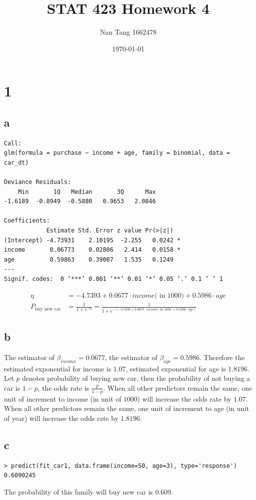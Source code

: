 \documentclass[11pt,letterpaper]{article}
\title{STAT 423 Homework 4}
\author{Nan Tang 1662478}
\date{\today}
\begin{document}
\maketitle
\section*{1}
\subsection*{a}
\begin{verbatim}
Call:
glm(formula = purchase ~ income + age, family = binomial, data = car_dt)

Deviance Residuals: 
    Min       1Q   Median       3Q      Max  
-1.6189  -0.8949  -0.5880   0.9653   2.0846  

Coefficients:
            Estimate Std. Error z value Pr(>|z|)  
(Intercept) -4.73931    2.10195  -2.255   0.0242 *
income       0.06773    0.02806   2.414   0.0158 *
age          0.59863    0.39007   1.535   0.1249  
---
Signif. codes:  0 ‘***’ 0.001 ‘**’ 0.01 ‘*’ 0.05 ‘.’ 0.1 ‘ ’ 1
\end{verbatim}

\begin{align*}
\eta &= -4.7393 + 0.0677 \cdot income \text{( in 1000)} + 0.5986 \cdot age \\
P_{\text{buy new car}} &= \frac{1}{1 + e^{-\eta}} = \frac{1}{1 + e^{-(-4.7393 + 0.0677 \cdot income \text{( in 1000)} + 0.5986 \cdot age) }}
\end{align*}

\subsection*{b}
\noindent The estimator of $\beta_{income} = 0.0677$, the estimator of $\beta_{age} = 0.5986$. Therefore the estimated exponential for income is $1.07$, estimated exponential for age is $1.8196$. \\

\noindent Let $p$ denotes probability of buying new car, then the probability of not buying a car is $1-p$, the odds rate is $\frac{p}{1-p}$. When all other predictors remain the same, one unit of increment to income (in unit of $1000$) will increase the odds rate by $1.07$. When all other predictors remain the same, one unit of increment to age (in unit of year) will increase the odds rate by $1.8196$.

\subsection*{c}
\begin{verbatim}
> predict(fit_car1, data.frame(income=50, age=3), type='response')
0.6090245 
\end{verbatim}
\noindent The probability of this family will buy new car is $0.609$. 
\end{document}

